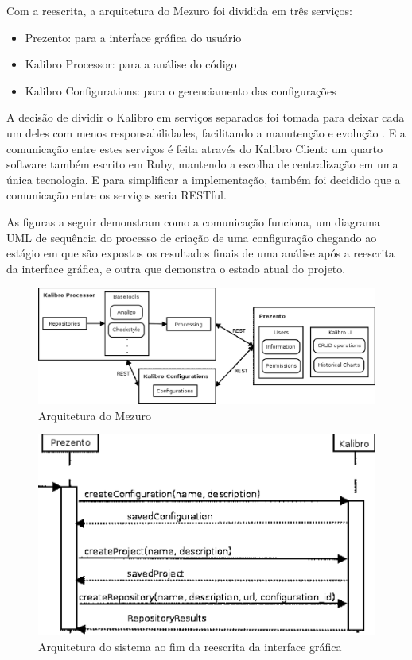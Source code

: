 Com a reescrita, a arquitetura do Mezuro foi dividida em três serviços:

\begin{itemize}
  \item Prezento: para a interface gráfica do usuário
  \item Kalibro Processor: para a análise do código
  \item Kalibro Configurations: para o gerenciamento das configurações
\end{itemize}

A decisão de dividir o Kalibro em serviços separados foi tomada para deixar
cada um deles com menos responsabilidades, facilitando a manutenção e evolução
\cite{camarinhaOSS2015}. E a comunicação entre estes serviços é feita através
do Kalibro Client: um quarto software também escrito em Ruby, mantendo a
escolha de centralização em uma única tecnologia. E para simplificar a
implementação, também foi decidido que a comunicação entre os serviços seria
RESTful.

As figuras a seguir demonstram como a comunicação funciona, um diagrama UML de
sequência do processo de criação de uma configuração chegando ao estágio em que
são expostos os resultados finais de uma análise após a reescrita da interface
gráfica, e outra que demonstra o estado atual do projeto.

\begin{figure}[!htb]
	\centering
    \includegraphics[keepaspectratio=true,scale=0.5]
    {figuras/mezuroCloudArch.eps}
  \caption{Arquitetura do Mezuro \cite{camarinhaOSS2015}}
	\label{fig:mezuroNoosferoArch}
\end{figure}

\begin{figure}[!htb]
	\centering
    \includegraphics[keepaspectratio=true,scale=0.7]
    {figuras/prevProcessingSeqDiag.eps}
  \caption{Arquitetura do sistema ao fim da reescrita da interface gráfica
  \cite{meirellesCibse2015}}
	\label{fig:prevProcessingSeqDiag}
\end{figure}

